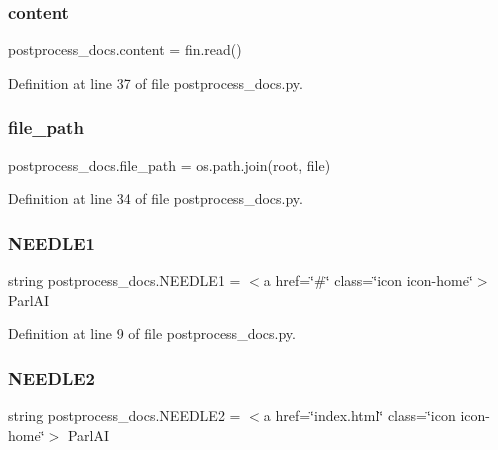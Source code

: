 \subsubsection{\texorpdfstring{content}{content}}
{\footnotesize\ttfamily postprocess\+\_\+docs.\+content = fin.\+read()}



Definition at line 37 of file postprocess\+\_\+docs.\+py.

\mbox{\label{namespacepostprocess__docs_a889f9a8eed613997e6e3ea9ae5035ab7}} 
\subsubsection{\texorpdfstring{file\+\_\+path}{file\_path}}
{\footnotesize\ttfamily postprocess\+\_\+docs.\+file\+\_\+path = os.\+path.\+join(root, file)}



Definition at line 34 of file postprocess\+\_\+docs.\+py.

\mbox{\label{namespacepostprocess__docs_aadfb0c7a8fbb247f4019a90179a067d1}} 
\subsubsection{\texorpdfstring{N\+E\+E\+D\+L\+E1}{NEEDLE1}}
{\footnotesize\ttfamily string postprocess\+\_\+docs.\+N\+E\+E\+D\+L\+E1 = \textquotesingle{}$<$a href=\char`\"{}\#\char`\"{} class=\char`\"{}icon icon-\/home\char`\"{}$>$ Parl\+AI\textquotesingle{}}



Definition at line 9 of file postprocess\+\_\+docs.\+py.

\mbox{\label{namespacepostprocess__docs_a97cdce480c1561c31f016431dc253817}} 
\subsubsection{\texorpdfstring{N\+E\+E\+D\+L\+E2}{NEEDLE2}}
{\footnotesize\ttfamily string postprocess\+\_\+docs.\+N\+E\+E\+D\+L\+E2 = \textquotesingle{}$<$a href=\char`\"{}index.\+html\char`\"{} class=\char`\"{}icon icon-\/home\char`\"{}$>$ Parl\+AI\textquotesingle{}}



